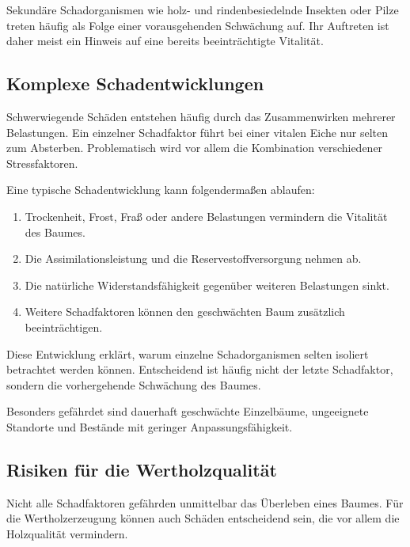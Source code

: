 \documentclass[twocolumn, bibliography=totoc, abstract=true]{scrartcl}
\begin{document}
Sekundäre Schadorganismen wie holz- und rindenbesiedelnde Insekten oder Pilze treten häufig als Folge einer vorausgehenden Schwächung auf. Ihr Auftreten ist daher meist ein Hinweis auf eine bereits beeinträchtigte Vitalität.

\subsection{Komplexe Schadentwicklungen}

Schwerwiegende Schäden entstehen häufig durch das Zusammenwirken mehrerer Belastungen. Ein einzelner Schadfaktor führt bei einer vitalen Eiche nur selten zum Absterben. Problematisch wird vor allem die Kombination verschiedener Stressfaktoren.

Eine typische Schadentwicklung kann folgendermaßen ablaufen:

\begin{enumerate}
\item Trockenheit, Frost, Fraß oder andere Belastungen vermindern die Vitalität des Baumes.
\item Die Assimilationsleistung und die Reservestoffversorgung nehmen ab.
\item Die natürliche Widerstandsfähigkeit gegenüber weiteren Belastungen sinkt.
\item Weitere Schadfaktoren können den geschwächten Baum zusätzlich beeinträchtigen.
\end{enumerate}

Diese Entwicklung erklärt, warum einzelne Schadorganismen selten isoliert betrachtet werden können. Entscheidend ist häufig nicht der letzte Schadfaktor, sondern die vorhergehende Schwächung des Baumes.

Besonders gefährdet sind dauerhaft geschwächte Einzelbäume, ungeeignete Standorte und Bestände mit geringer Anpassungsfähigkeit.

\subsection{Risiken für die Wertholzqualität}

Nicht alle Schadfaktoren gefährden unmittelbar das Überleben eines Baumes. Für die Wertholzerzeugung können auch Schäden entscheidend sein, die vor allem die Holzqualität vermindern.
\end{document}
